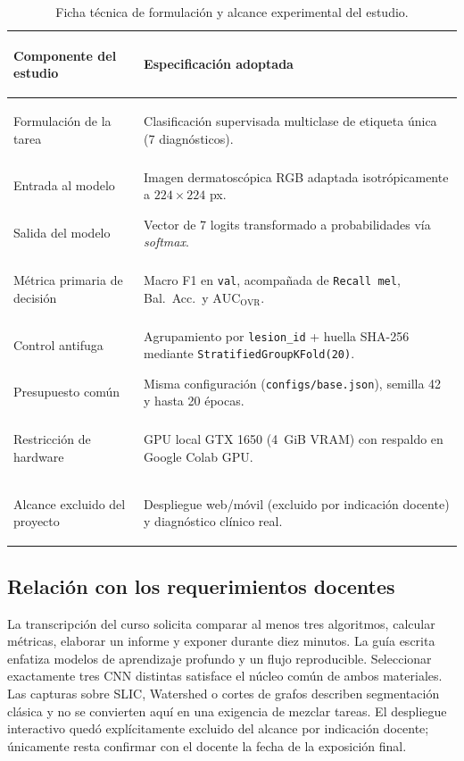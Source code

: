 \begin{table}[htbp]\centering\small
\caption{Ficha técnica de formulación y alcance experimental del estudio.}
\begin{tabularx}{\textwidth}{@{}>{\bfseries\raggedright\arraybackslash}p{4.3cm}>{\raggedright\arraybackslash}X@{}}
\toprule
\textbf{Componente del estudio} & \textbf{Especificación adoptada} \\ \midrule
Formulación de la tarea & Clasificación supervisada multiclase de etiqueta única (7 diagnósticos). \\
Entrada al modelo & Imagen dermatoscópica RGB adaptada isotrópicamente a $224\times224$ px. \\
Salida del modelo & Vector de 7 logits transformado a probabilidades vía \textit{softmax}. \\
Métrica primaria de decisión & Macro F1 en \texttt{val}, acompañada de \texttt{Recall mel}, Bal.\ Acc.\ y $\mathrm{AUC}_{\mathrm{OVR}}$. \\
Control antifuga & Agrupamiento por \texttt{lesion\_id} + huella SHA-256 mediante \texttt{StratifiedGroupKFold(20)}. \\
Presupuesto común & Misma configuración (\texttt{configs/base.json}), semilla 42 y hasta 20 épocas. \\
Restricción de hardware & GPU local GTX 1650 (4~GiB VRAM) con respaldo en Google Colab GPU. \\
Alcance excluido del proyecto & Despliegue web/móvil (excluido por indicación docente) y diagnóstico clínico real. \\
\bottomrule
\end{tabularx}
\end{table}

\subsection{Relación con los requerimientos docentes}
La transcripción del curso solicita comparar al menos tres algoritmos, calcular métricas, elaborar un informe y exponer durante diez minutos. La guía escrita enfatiza modelos de aprendizaje profundo y un flujo reproducible. Seleccionar exactamente tres CNN distintas satisface el núcleo común de ambos materiales. Las capturas sobre SLIC, Watershed o cortes de grafos describen segmentación clásica y no se convierten aquí en una exigencia de mezclar tareas. El despliegue interactivo quedó explícitamente excluido del alcance por indicación docente; únicamente resta confirmar con el docente la fecha de la exposición final.

